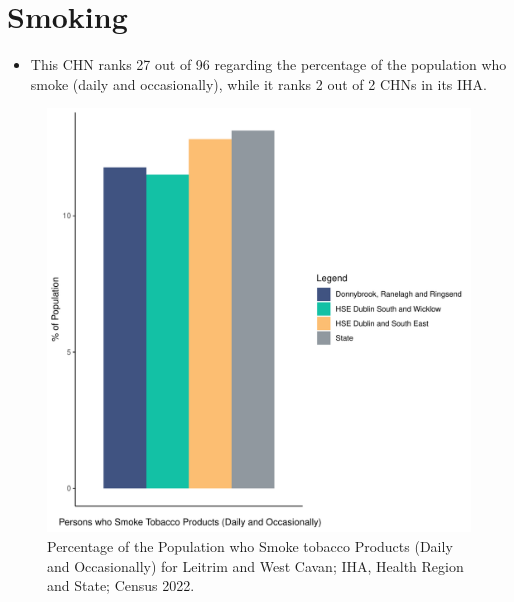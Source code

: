 \documentclass{article}
\begin{document}
\pagebreak

\section{Smoking}\label{sect:Smoking}
\begin{itemize}
\item This CHN ranks  27 out of 96 regarding the percentage of the population who smoke (daily and occasionally), while it ranks   2 out of 2 CHNs in its IHA.
\end{itemize}
\begin{figure}[H]
	\centering
	\includegraphics[width = 120mm]{../figures/SmokingED.pdf}
	\caption{Percentage of the Population who Smoke tobacco Products (Daily and Occasionally) for Leitrim and West Cavan; IHA, Health Region and State; Census 2022.}
	\label{fig:2ae19629-1a6a-13a3-e055-000000000001}
	\end{figure}
	
\end{document}
